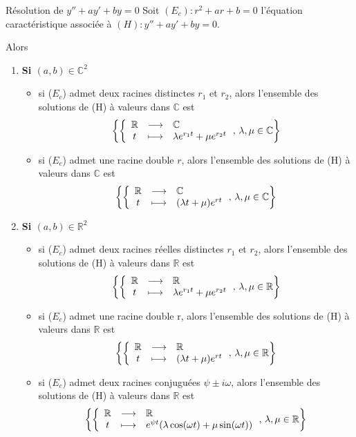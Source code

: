     \begin{theo}{Résolution de $y'' + ay' + by = 0$}{}
        Soit $(E_{c}) : r^{2} + ar+ b = 0$ l’équation caractéristique associée à $(H) : y'' + ay' + by = 0$.
        
        Alors
        \begin{enumerate}
            \item \textbf{Si $(a, b) \in \mathbb{C}^{2}$}  
            \begin{itemize}
                \item si ($E_{c}$) admet deux racines distinctes $r_1$ et $r_2$, alors l’ensemble des solutions de (H) à valeurs dans $\mathbb{C}$ est \[ \left\{
                    \application{\mathbb{R}}{\mathbb{C}}{t}{\lambda e^{r_1t}+\mu e^{r_2t}}, \, \lambda,\mu \in \mathbb{C}
                  \right\} \]
                \item si ($E_{c}$) admet une racine double $r$, alors l’ensemble des solutions de (H) à valeurs dans $\mathbb{C}$ est \[ \left\{
                    \application{\mathbb{R}}{\mathbb{C}}{t}{(\lambda t+\mu) e^{rt}}, \, \lambda,\mu \in \mathbb{C}
                  \right\} \]
                \end{itemize}
            \item \textbf{Si $(a, b) \in \mathbb{R}^{2}$}
            \begin{itemize}
                \item si ($E_{c}$) admet deux racines réelles distinctes $r_1$ et $r_2$, alors l’ensemble des solutions de (H) à valeurs dans $\mathbb{R}$ est \[ \left\{
                    \application{\mathbb{R}}{\mathbb{R}}{t}{\lambda e^{r_1t}+\mu e^{r_2t}}, \, \lambda,\mu \in \mathbb{R}
                  \right\} \] 
                
                \item si ($E_{c}$) admet une racine double r, alors l’ensemble des solutions de (H) à valeurs dans $\mathbb{R}$ est \[ \left\{
                    \application{\mathbb{R}}{\mathbb{R}}{t}{(\lambda t+\mu) e^{rt}}, \, \lambda,\mu \in \mathbb{R}
                  \right\} \]
                  
                \item si ($E_{c}$) admet deux racines conjuguées $\psi \pm i\omega$, alors l’ensemble des solutions de (H) à valeurs dans $\mathbb{R}$ est \[ \left\{
                    \application{\mathbb{R}}{\mathbb{R}}{t}{e^{\psi t}(\lambda \cos(\omega t) + \mu \sin(\omega t))}, \,  \lambda,\mu \in \mathbb{R}
                  \right\} \]
            \end{itemize}
        \end{enumerate}
    \end{theo}

